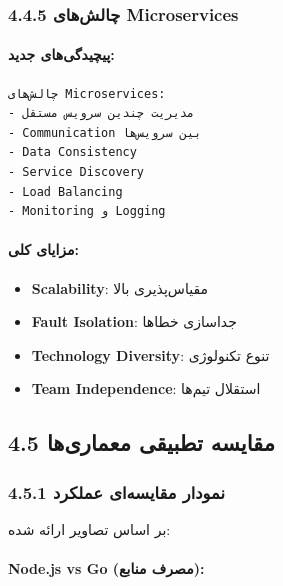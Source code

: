\documentclass[
]{article}
\providecommand{\tightlist}{%
  \setlength{\itemsep}{0pt}\setlength{\parskip}{0pt}}
\begin{document}
\subsubsection{4.4.5 چالش‌های
Microservices}\label{ux686ux627ux644ux634ux647ux627ux6cc-microservices}

\paragraph{پیچیدگی‌های
جدید:}\label{ux67eux6ccux686ux6ccux62fux6afux6ccux647ux627ux6cc-ux62cux62fux6ccux62f}

\begin{verbatim}
چالش‌های Microservices:
- مدیریت چندین سرویس مستقل
- Communication بین سرویس‌ها
- Data Consistency
- Service Discovery
- Load Balancing
- Monitoring و Logging
\end{verbatim}

\paragraph{مزایای
کلی:}\label{ux645ux632ux627ux6ccux627ux6cc-ux6a9ux644ux6cc}

\begin{itemize}
\tightlist
\item
  \textbf{Scalability}: مقیاس‌پذیری بالا
\item
  \textbf{Fault Isolation}: جداسازی خطاها
\item
  \textbf{Technology Diversity}: تنوع تکنولوژی
\item
  \textbf{Team Independence}: استقلال تیم‌ها
\end{itemize}

\subsection{4.5 مقایسه تطبیقی
معماری‌ها}\label{ux645ux642ux627ux6ccux633ux647-ux62aux637ux628ux6ccux642ux6cc-ux645ux639ux645ux627ux631ux6ccux647ux627}

\subsubsection{4.5.1 نمودار مقایسه‌ای
عملکرد}\label{ux646ux645ux648ux62fux627ux631-ux645ux642ux627ux6ccux633ux647ux627ux6cc-ux639ux645ux644ux6a9ux631ux62f}

بر اساس تصاویر ارائه شده:

\paragraph{Node.js vs Go (مصرف
منابع):}\label{node.js-vs-go-ux645ux635ux631ux641-ux645ux646ux627ux628ux639}
\end{document}
